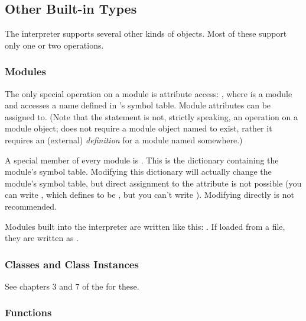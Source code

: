 \subsection{Other Built-in Types \label{typesother}}

The interpreter supports several other kinds of objects.
Most of these support only one or two operations.


\subsubsection{Modules \label{typesmodules}}

The only special operation on a module is attribute access:
, where  is a module and 
accesses a name defined in 's symbol table.  Module attributes
can be assigned to.  (Note that the  statement is not,
strictly speaking, an operation on a module object;  does not require a module object named  to exist,
rather it requires an (external) \emph{definition} for a module named
 somewhere.)

A special member of every module is .
This is the dictionary containing the module's symbol table.
Modifying this dictionary will actually change the module's symbol
table, but direct assignment to the  attribute is not
possible (you can write , which
defines  to be , but you can't write
).  Modifying  directly
is not recommended.

Modules built into the interpreter are written like this:
.  If loaded from a file, they are
written as .


\subsubsection{Classes and Class Instances \label{typesobjects}}

See chapters 3 and 7 of the  for these.


\subsubsection{Functions \label{typesfunctions}}

